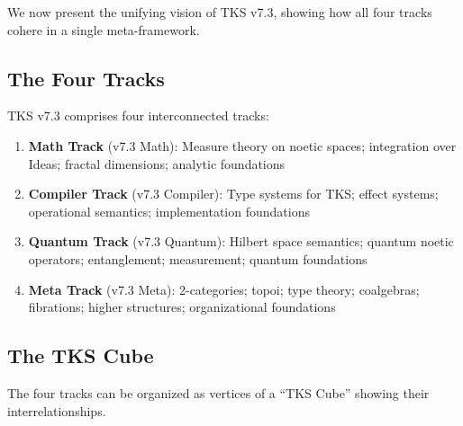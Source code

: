 We now present the unifying vision of TKS v7.3, showing how all four tracks
cohere in a single meta-framework.

\subsection{The Four Tracks}
\label{subsec:four-tracks}

TKS v7.3 comprises four interconnected tracks:

\begin{definition}
\label{def:four-tracks}
\begin{enumerate}
  \item \textbf{Math Track} (v7.3 Math): Measure theory on noetic spaces;
        integration over Ideas; fractal dimensions; analytic foundations
  \item \textbf{Compiler Track} (v7.3 Compiler): Type systems for TKS;
        effect systems; operational semantics; implementation foundations
  \item \textbf{Quantum Track} (v7.3 Quantum): Hilbert space semantics;
        quantum noetic operators; entanglement; measurement; quantum foundations
  \item \textbf{Meta Track} (v7.3 Meta): 2-categories; topoi; type theory;
        coalgebras; fibrations; higher structures; organizational foundations
\end{enumerate}
\end{definition}

\subsection{The TKS Cube}
\label{subsec:tks-cube}

The four tracks can be organized as vertices of a ``TKS Cube'' showing their
interrelationships.

